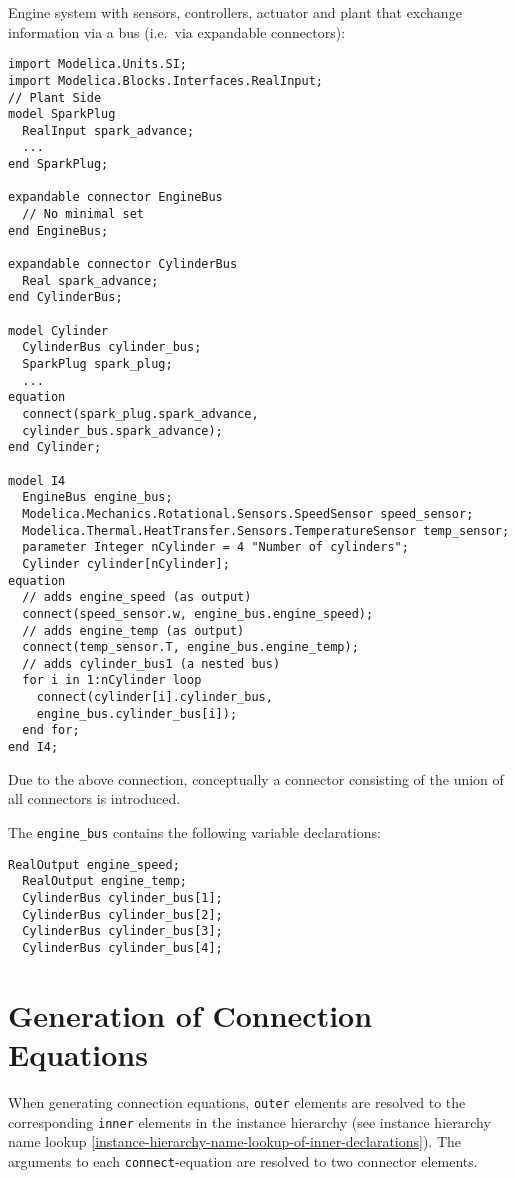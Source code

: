\begin{example}
Engine system with sensors, controllers, actuator and plant that
exchange information via a bus (i.e.\ via expandable connectors):
\begin{lstlisting}[language=modelica]
import Modelica.Units.SI;
import Modelica.Blocks.Interfaces.RealInput;
// Plant Side
model SparkPlug
  RealInput spark_advance;
  ...
end SparkPlug;

expandable connector EngineBus
  // No minimal set
end EngineBus;

expandable connector CylinderBus
  Real spark_advance;
end CylinderBus;

model Cylinder
  CylinderBus cylinder_bus;
  SparkPlug spark_plug;
  ...
equation
  connect(spark_plug.spark_advance,
  cylinder_bus.spark_advance);
end Cylinder;

model I4
  EngineBus engine_bus;
  Modelica.Mechanics.Rotational.Sensors.SpeedSensor speed_sensor;
  Modelica.Thermal.HeatTransfer.Sensors.TemperatureSensor temp_sensor;
  parameter Integer nCylinder = 4 "Number of cylinders";
  Cylinder cylinder[nCylinder];
equation
  // adds engine_speed (as output)
  connect(speed_sensor.w, engine_bus.engine_speed);
  // adds engine_temp (as output)
  connect(temp_sensor.T, engine_bus.engine_temp);
  // adds cylinder_bus1 (a nested bus)
  for i in 1:nCylinder loop
    connect(cylinder[i].cylinder_bus,
    engine_bus.cylinder_bus[i]);
  end for;
end I4;
\end{lstlisting}
Due to the above connection, conceptually a connector consisting
of the union of all connectors is introduced.

The \lstinline!engine_bus! contains the following variable declarations:
\begin{lstlisting}[language=modelica]
  RealOutput engine_speed;
  RealOutput engine_temp;
  CylinderBus cylinder_bus[1];
  CylinderBus cylinder_bus[2];
  CylinderBus cylinder_bus[3];
  CylinderBus cylinder_bus[4];
\end{lstlisting}
\end{example}

\section{Generation of Connection Equations}

When generating connection equations, \lstinline!outer! elements are resolved to the
corresponding \lstinline!inner! elements in the instance hierarchy (see instance
hierarchy name lookup \autoref{instance-hierarchy-name-lookup-of-inner-declarations}). The arguments to each \lstinline!connect!-equation are
resolved to two connector elements.

